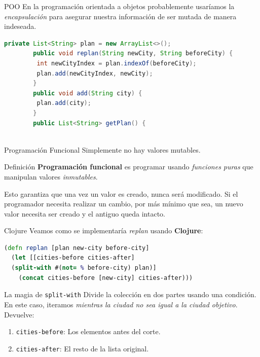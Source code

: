 \documentclass{beamer}
\begin{document}
\begin{frame}[fragile]{POO}
    En la programación orientada a objetos probablemente usaríamos la \textit{encapsulación} para asegurar nuestra información de ser mutada de manera indeseada.

     \begin{lstlisting}[language=Java]
        private List<String> plan = new ArrayList<>();
        public void replan(String newCity, String beforeCity) {
         int newCityIndex = plan.indexOf(beforeCity);
         plan.add(newCityIndex, newCity);
        }
        public void add(String city) {
         plan.add(city);
        }
        public List<String> getPlan() {
        
    \end{lstlisting}
\end{frame}

\begin{frame}{Programación Funcional}
    Simplemente no hay valores mutables.
    \begin{block}{Definición}
        \textbf{Programación funcional} es programar usando \textit{funciones puras} que manipulan valores \textit{inmutables}.
    \end{block}

    Esto garantiza que una vez un valor es creado, nunca será modificado. Si el programador necesita realizar un cambio, por más mínimo que sea, un nuevo valor necesita ser creado y el antiguo queda intacto.
\end{frame}



\begin{frame}[fragile]{Clojure}
    Veamos como se implementaría \textit{replan} usando \textbf{Clojure}:
    
\begin{lstlisting}[language=Clojure]
(defn replan [plan new-city before-city]
  (let [[cities-before cities-after] 
  (split-with #(not= % before-city) plan)]
    (concat cities-before [new-city] cities-after)))
        \end{lstlisting}

        \begin{block}{La magia de \texttt{split-with}}
        Divide la colección en dos partes usando una condición. En este caso, iteramos \textit{mientras la ciudad no sea igual a la ciudad objetivo}. Devuelve:
        \begin{enumerate}
            \item \texttt{cities-before}: Los elementos antes del corte.
            \item \texttt{cities-after}: El resto de la lista original.
        \end{enumerate}
    \end{block}

\end{frame}
\end{document}
